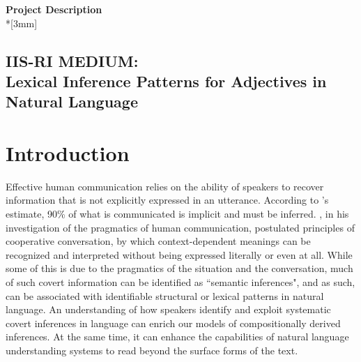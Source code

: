 \documentclass[10pt]{article}
\begin{document}
\begin{center}
{\LARGE{\bf Project Description}}\\*[3mm]
\subsection*{IIS-RI MEDIUM: \\
Lexical Inference Patterns for Adjectives in Natural Language}
\end{center}


\section{Introduction}

Effective human communication relies on the ability of speakers to recover information that is not explicitly expressed in an utterance. According to \cite{graesser1985implicit}'s estimate, 90\% of what 
is communicated is implicit and must be inferred. \cite{grice1975logic}, in his investigation 
of the pragmatics of human communication, postulated principles of cooperative 
conversation, by which context-dependent meanings can be recognized and interpreted 
without being expressed literally or even at all. While some of this is due to the pragmatics of the situation and the conversation, much of such covert information can be identified as ``semantic inferences", and as such, can be associated with identifiable structural or lexical patterns in natural language.
An understanding of how speakers identify and exploit systematic covert inferences in language can enrich our models of compositionally derived inferences. At the same time, it can enhance the capabilities of natural language understanding systems to read beyond the surface forms of the text.
\end{document}
